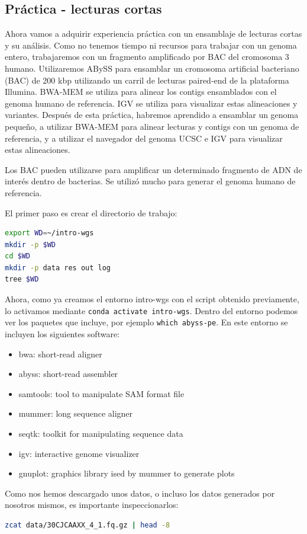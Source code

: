 \begin{itemize}
\section{Práctica - lecturas cortas}
Ahora vamos a adquirir experiencia práctica con un ensamblaje de lecturas cortas y su análisis.
Como no tenemos tiempo ni recursos para trabajar con un genoma entero, trabajaremos con un fragmento amplificado por BAC del cromosoma 3 humano.
Utilizaremos ABySS para ensamblar un cromosoma artificial bacteriano (BAC) de 200 kbp utilizando un carril de lecturas paired-end de la plataforma Illumina. BWA-MEM se utiliza para alinear los contigs ensamblados con el genoma humano de referencia. IGV se utiliza para visualizar estas alineaciones y variantes.
Después de esta práctica, habremos aprendido a ensamblar un genoma pequeño, a utilizar BWA-MEM para alinear lecturas y contigs con un genoma de referencia, y a utilizar el navegador del genoma UCSC e IGV para visualizar estas alineaciones.

Los BAC pueden utilizarse para amplificar un determinado fragmento de ADN de interés dentro de bacterias. Se utilizó mucho para generar el genoma humano de referencia.

El primer paso es crear el directorio de trabajo:
\begin{lstlisting}[language=bash]
export WD=~/intro-wgs 
mkdir -p $WD
cd $WD
mkdir -p data res out log 
tree $WD
\end{lstlisting}

Ahora, como ya creamos el entorno intro-wgs con el script obtenido previamente, lo activamos mediante \texttt{conda activate intro-wgs}. Dentro del entorno podemos ver los paquetes que incluye, por ejemplo \texttt{which abyss-pe}. En este entorno se incluyen los siguientes software:
\begin{itemize}
\item bwa: short-read aligner
\item abyss: short-read assembler
\item samtools: tool to manipulate SAM format file
\item mummer: long sequence aligner
\item seqtk: toolkit for manipulating sequence data
\item igv: interactive genome visualizer
\item gnuplot: graphics library ised by mummer to generate plots
\end{itemize}

Como nos hemos descargado unos datos, o incluso los datos generados por nosotros mismos, es importante inspeccionarlos: 
\begin{lstlisting}[language=bash]
zcat data/30CJCAAXX_4_1.fq.gz | head -8


\end{lstlisting}
\end{itemize}
